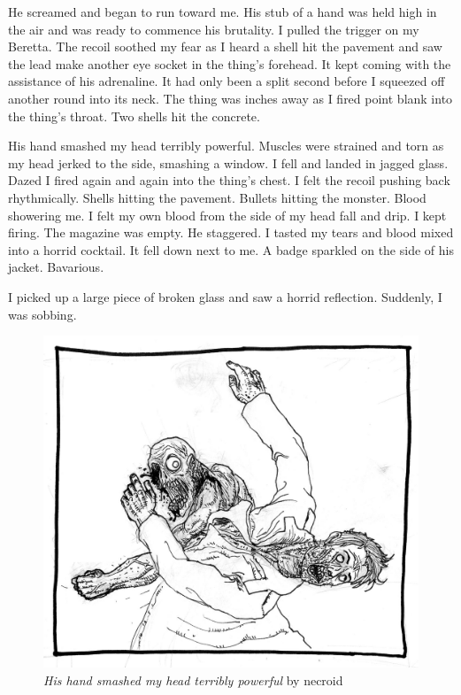 He screamed and began to run toward me. His stub of a hand was held high
in the air and was ready to commence his brutality. I pulled the trigger
on my Beretta. The recoil soothed my fear as I heard a shell hit the
pavement and saw the lead make another eye socket in the thing's
forehead. It kept coming with the assistance of his adrenaline. It had
only been a split second before I squeezed off another round into its
neck. The thing was inches away as I fired point blank into the thing's
throat. Two shells hit the concrete.

His hand smashed my head terribly powerful. Muscles were strained and
torn as my head jerked to the side, smashing a window. I fell and landed
in jagged glass. Dazed I fired again and again into the thing's chest. I
felt the recoil pushing back rhythmically. Shells hitting the
pavement. Bullets hitting the monster. Blood showering me. I felt my own
blood from the side of my head fall and drip. I kept firing. The
magazine was empty. He staggered. I tasted my tears and blood mixed into
a horrid cocktail. It fell down next to me. A badge sparkled on the side
of his jacket. Bavarious.

I picked up a large piece of broken glass and saw a horrid
reflection. Suddenly, I was sobbing.

\begin{figure}[b]
  \includegraphics[width=\textwidth]{art/necroid-his_hand_smashed.jpg}
  \caption{{\em His hand smashed my head terribly powerful} by necroid}
\end{figure}


